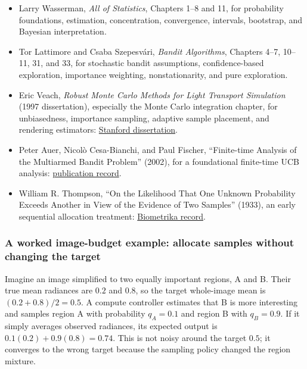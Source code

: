 \hypertarget{02-foundations-ii-ch029-references-for-deeper-source-checks}{}

\begin{itemize}
\tightlist
\item
  Larry Wasserman, \emph{All of Statistics}, Chapters 1--8 and 11, for probability foundations, estimation, concentration, convergence, intervals, bootstrap, and Bayesian interpretation.
\item
  Tor Lattimore and Csaba Szepesvári, \emph{Bandit Algorithms}, Chapters 4--7, 10--11, 31, and 33, for stochastic bandit assumptions, confidence-based exploration, importance weighting, nonstationarity, and pure exploration.
\item
  Eric Veach, \emph{Robust Monte Carlo Methods for Light Transport Simulation} (1997 dissertation), especially the Monte Carlo integration chapter, for unbiasedness, importance sampling, adaptive sample placement, and rendering estimators: \href{https://graphics.stanford.edu/papers/veach_thesis/}{Stanford dissertation}.
\item
  Peter Auer, Nicolò Cesa-Bianchi, and Paul Fischer, ``Finite-time Analysis of the Multiarmed Bandit Problem'' (2002), for a foundational finite-time UCB analysis: \href{https://www2.compute.dtu.dk/pubdb/pubs/2088-full.html}{publication record}.
\item
  William R. Thompson, ``On the Likelihood That One Unknown Probability Exceeds Another in View of the Evidence of Two Samples'' (1933), an early sequential allocation treatment: \href{https://academic.oup.com/biomet/article-abstract/25/3-4/285/200862}{Biometrika record}.
\end{itemize}

\subsubsection{A worked image-budget example: allocate samples without changing the target}\label{02-foundations-ii-ch029-a-worked-image-budget-example-allocate-samples-without-changing-the-target}

\hypertarget{02-foundations-ii-ch029-a-worked-image-budget-example-allocate-samples-without-changing-the-target}{}

Imagine an image simplified to two equally important regions, A and B. Their true mean radiances are \(0.2\) and \(0.8\), so the target whole-image mean is \((0.2+0.8)/2=0.5\). A compute controller estimates that B is more interesting and samples region A with probability \(q_A=0.1\) and region B with \(q_B=0.9\). If it simply averages observed radiances, its expected output is \(0.1(0.2)+0.9(0.8)=0.74\). This is not noisy around the target \(0.5\); it converges to the wrong target because the sampling policy changed the region mixture.

